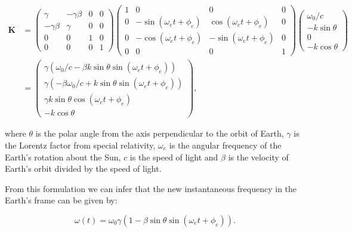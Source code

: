\documentclass[onecolumn, groupedaddress, 10pt]{revtex4-1}
\begin{document}
\begin{align}
\label{eqn: new k}
\mathbf{K} &=
\left( \begin{array}{cccc}
	    \gamma   & -\gamma \beta & 0 & 0 \\
	-\gamma \beta &    \gamma    & 0 & 0 \\
	      0      &       0      & 1 & 0 \\
	      0      &       0      & 0 & 1
\end{array} \right)
\left( \begin{array}{cccc}
	1 &               0             &              0               & 0 \\
	0 & -\sin (\omega_e t + \phi_e) &  \cos (\omega_e t + \phi_e)  & 0 \\
	0 & -\cos (\omega_e t + \phi_e) &  -\sin (\omega_e t + \phi_e) & 0 \\
	0 &               0             &              0               & 1
\end{array} \right)							 
\left( \begin{array}{c}	
	   \omega_0 / c   \\
	- k \sin \theta \\
	        0       \\
	- k \cos \theta    
\end{array} \right)																			\\
&=
\left( \begin{array}{c}
	\gamma \left(\omega_0 / c - \beta k \sin \theta \sin (\omega_e t + \phi_e)\right) \\
	\gamma \left(-\beta \omega_0 / c + k \sin \theta \sin (\omega_e t + \phi_e)\right) \\
	           \gamma k \sin \theta \cos (\omega_e t + \phi_e)           \\
	                           - k \cos \theta
\end{array} \right)   ,
\end{align}

where $\theta$ is the polar angle from the axis perpendicular to the orbit of Earth, $\gamma$ is the Lorentz factor from special relativity, $\omega_e$ is the angular frequency of the Earth's rotation about the Sun, $c$ is the speed of light and $\beta$ is the velocity of Earth's orbit divided by the speed of light.

From this formulation we can infer that the new instantaneous frequency in the Earth's frame can be given by:

\begin{equation}
\omega (t) = \omega_0 \gamma \left( 1 - \beta \sin \theta \sin (\omega_e t + \phi_e) \right). 
\end{equation}
\end{document}
